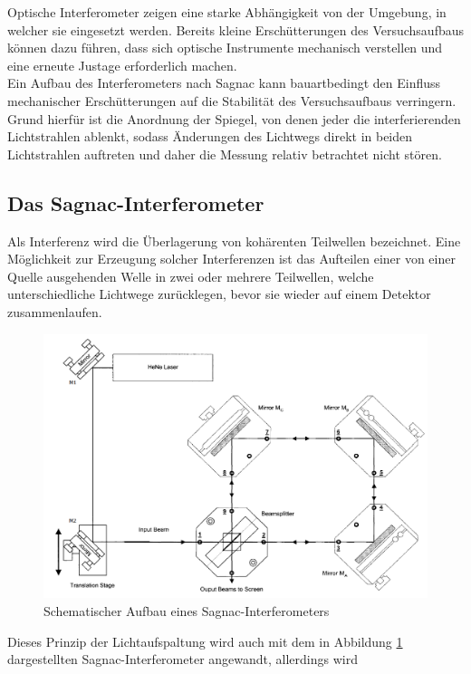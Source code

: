 \noindent Optische Interferometer zeigen eine starke Abhängigkeit von der Umgebung, in
welcher sie eingesetzt werden. Bereits kleine Erschütterungen des Versuchsaufbaus
können dazu führen, dass sich optische Instrumente mechanisch verstellen und eine
erneute Justage erforderlich machen. \\
\noindent Ein Aufbau des Interferometers nach Sagnac kann bauartbedingt den
Einfluss mechanischer Erschütterungen auf die Stabilität des Versuchsaufbaus
verringern. Grund hierfür ist die Anordnung der Spiegel, von denen jeder die
interferierenden Lichtstrahlen ablenkt, sodass Änderungen des Lichtwegs direkt
in beiden Lichtstrahlen auftreten und daher die Messung relativ betrachtet nicht
stören. \\
\subsection{Das Sagnac-Interferometer}
\noindent Als Interferenz wird die Überlagerung von kohärenten Teilwellen
bezeichnet. Eine Möglichkeit zur Erzeugung solcher Interferenzen ist das
Aufteilen einer von einer Quelle ausgehenden Welle in zwei oder mehrere
Teilwellen, welche unterschiedliche Lichtwege zurücklegen, bevor sie wieder
auf einem Detektor zusammenlaufen. \\
\FloatBarrier
\begin{figure}
  \centering
  \includegraphics[scale=0.5]{resources/fig_01.png}
  \caption{Schematischer Aufbau eines Sagnac-Interferometers \cite{sample}}
  \label{fig:01}
\end{figure}
\FloatBarrier
\noindent Dieses Prinzip der Lichtaufspaltung wird auch mit dem in Abbildung
\ref{fig:01} dargestellten Sagnac-Interferometer angewandt, allerdings wird
